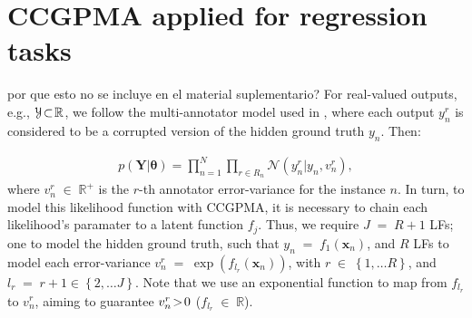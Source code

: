 \documentclass[journal]{IEEEtran}
\providecommand{\ve}[1]{{\bm{#1}}}%
\providecommand{\mat}[1]{{\bm{#1}}} %
\newcommand{\Real}{\mathbb{R}}
\DeclareMathOperator{\en}{\!\,\in\!\,}
\DeclareMathOperator{\igual}{\!\,=\!\,}
\providecommand{\s}[1]{\negthinspace#1\negthinspace}%
\providecommand{\ve}[1]{{\mathbf{#1}}}
\providecommand{\mat}[1]{{\mathbf{#1}}}
\newcommand{\gauss}{\mathcal{N}} %
\newcommand{\comment}[2]{{\color{blue}#1} {\color{red}#2}}
\begin{document}

\footnotesize








%
%
%
\appendices
{}

\section{CCGPMA applied for regression tasks}\label{CCGPMAReg}
\comment{}{por que esto no se incluye en el material suplementario?}
For real-valued outputs, e.g., $\mathcal{Y} \s{\subset}\Real$, we follow the multi-annotator model used in \cite{raykar2010learning,groot2011learning,xiao2013learning,rodrigues2017learning}, where each output $y_n^r$ is considered to be a corrupted version of the hidden ground truth $y_n$. Then:

\begin{align}
\label{eq:RegLik}
p(\mat{Y}|{\bm{\theta}}) = \prod^N_{n=1}\prod_{r\in R_n}\gauss\left(y_n^r|y_n,v_{n}^r\right),
\end{align}
where $v_{n}^r\en\Real^+$ is the $r$-th annotator error-variance for the instance $n$. In turn, to model this likelihood function with CCGPMA, it is necessary to chain each likelihood's paramater to a latent function $f_j$. Thus, we require $J\igual R+1$ LFs; one to model the hidden ground truth, such that $y_n\igual f_1(\ve{x}_n)$, and $R$ LFs to model each error-variance $v_{n}^r\igual \exp(f_{l_r}(\ve{x}_n))$, with $r\en \left\{1, \dots R\right\}$, and $l_r \igual r+1 \in \left\{2, \dots J\right\}$. Note that we use an exponential function to map from $f_{l_r}$ to $v_{n}^r$, aiming to guarantee $v_{n}^r\s{>}0$ ($f_{l_r}\en \Real$).
\end{document}
